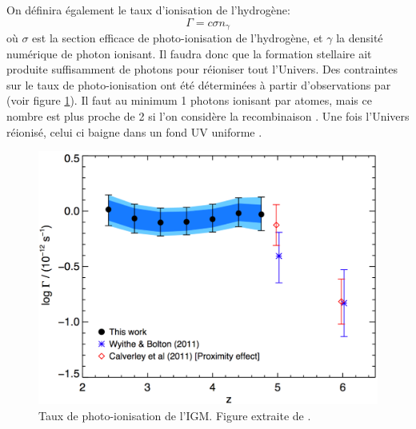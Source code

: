 On définira également le taux d'ionisation de l'hydrogène:
\begin{equation}
\Gamma = c \sigma n_\gamma
\end{equation}
où $\sigma$ est la section efficace de photo-ionisation de l'hydrogène, et $\gamma$ la densité numérique de photon ionisant.
Il faudra donc que la formation stellaire ait produite suffisamment de photons pour réioniser tout l'Univers.
Des contraintes sur le taux de photo-ionisation ont été déterminées à partir d'observations par \cite{2013MNRAS.436.1023B} (voir figure \ref{fig:photoionisationrate}).
Il faut au minimum 1 photons ionisant par atomes, mais ce nombre est plus proche de 2 si l'on considère la recombinaison \citep{aubert_reionization_2010}.
Une fois l'Univers réionisé, celui ci baigne dans un fond UV uniforme \citep{haardt_radiative_2012}.


\begin{figure}
        \includegraphics[width=.95\linewidth]{img/01/photon_obs.pdf} 
        \caption[Taux de photo-ionisation ]{Taux de photo-ionisation de l'\ac{IGM}. 
        Figure extraite de \cite{2013MNRAS.436.1023B}.
 		\label{fig:photoionisationrate}}
\end{figure}



\clearpage


